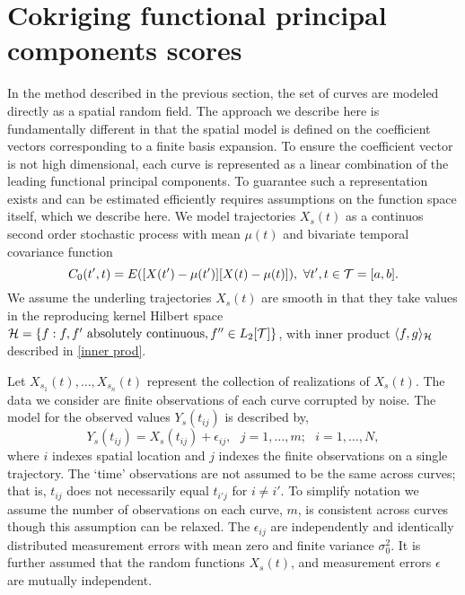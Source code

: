 \section{Cokriging functional principal components scores} %
\label{sec:cokriging_functional_principal_compents_scores}
In the method described in the previous section, the set of curves are modeled directly as a spatial random field. The approach we describe here is fundamentally different in that the spatial model is defined on the coefficient vectors corresponding to a finite basis expansion. To ensure the coefficient vector is not high dimensional, each curve is represented as a linear combination of the leading functional principal components. To guarantee such a representation exists and can be estimated efficiently requires assumptions on the function space itself, which we describe here. 
  We model trajectories $X_s(t)$ as a continuos second order stochastic process with mean $\mu(t)$ and bivariate temporal covariance function
\begin{equation}
	C_{0}(t',t)=E([X(t')-\mu(t')][X(t)-\mu(t)]),\mbox{ }\forall t',t\in \mathcal{T}=[a,b]. 
\end{equation} 
 We assume the underling trajectories $X_s(t)$ are smooth in that they take values in the reproducing kernel Hilbert space $\mathcal{H}= \{f : f, f' \mbox{ absolutely continuous}, f'' \in L_2[\mathcal{T}]\}$, with inner product $\langle f, g \rangle_{\mathcal{H}}$ described in \eqref{inner prod}.

Let $X_{s_1}(t), \dots, X_{s_n}(t)$ represent the collection of realizations of $X_s(t)$. The data we consider are finite observations of each curve corrupted by noise. The model for the observed values $Y_s(t_{ij})$ is described by,
\begin{equation}
	Y_s(t_{ij})=X_s(t_{ij})+\epsilon_{ij},\mbox{ }j=1,\dots,m;\mbox{ }i=1,\dots,N, \label{kriging:observation model}
\end{equation} 
where $i$ indexes spatial location and $j$ indexes the finite observations on a single trajectory. The `time' observations are not assumed to be the same across curves; that is, $t_{ij}$ does not necessarily equal $t_{i'j}$ for $i \neq i'$. To simplify notation we assume the number of observations on each curve, $m$, is consistent across curves though this assumption can be relaxed. The $\epsilon_{ij}$ are independently and identically distributed measurement errors with mean zero and finite variance $\sigma_{0}^{2}.$ It is further assumed that the random functions $X_s(t)$, and measurement errors $\epsilon$ are mutually independent. 

